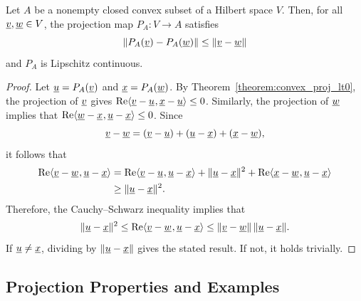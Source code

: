\begin{corollary}
\label{corollary:convex_projection_nonexpansive}
Let $A$ be a nonempty closed convex subset of a Hilbert space $V$.
Then, for all $\underline{v},\underline{w}\in V$, the projection map $P_A:V\to A$ satisfies
\[
\left\|P_A(\underline{v})-P_A(\underline{w})\right\|
\leq
\left\|\underline{v}-\underline{w}\right\|
\]
and $P_A$ is Lipschitz continuous.
\end{corollary}

\begin{proof}
Let $\underline u=P_A(\underline v)$ and $\underline x=P_A(\underline w)$.
By Theorem~\ref{theorem:convex_proj_lt0}, the projection of $\underline{v}$ gives
$\mathrm{Re}{\langle \underline v-\underline u \mskip1mu , \underline x-\underline u \rangle}\leq 0$.
Similarly, the projection of $\underline w$ implies that $ \mathrm{Re}{\langle \underline w-\underline x \mskip1mu , \underline u-\underline x \rangle}\leq 0$.
Since
\[
\underline v-\underline w
=
(\underline v-\underline u)
+
(\underline u-\underline x)
+
(\underline x-\underline w),
\]
it follows that
\begin{align*}
\mathrm{Re}{\langle \underline v-\underline w \mskip1mu , \underline u-\underline x \rangle}
&=
\mathrm{Re}{\langle \underline v-\underline u \mskip1mu , \underline u-\underline x \rangle}
+\|\underline u-\underline x\|^2
+\mathrm{Re}{\langle \underline x-\underline w \mskip1mu , \underline u-\underline x \rangle} \\
&\geq \|\underline u-\underline x\|^2.
\end{align*}
Therefore, the Cauchy--Schwarz inequality implies that
\[
\|\underline u-\underline x\|^2
\leq
\mathrm{Re}{\langle \underline v-\underline w \mskip1mu , \underline u-\underline x \rangle}
\leq
\|\underline v-\underline w\| \, \|\underline u-\underline x\|.
\]
If $\underline u \neq \underline x$, dividing by $\|\underline u-\underline x\|$ gives the stated result.
If not, it holds trivially.
\end{proof}


\subsection{Projection Properties and Examples}


